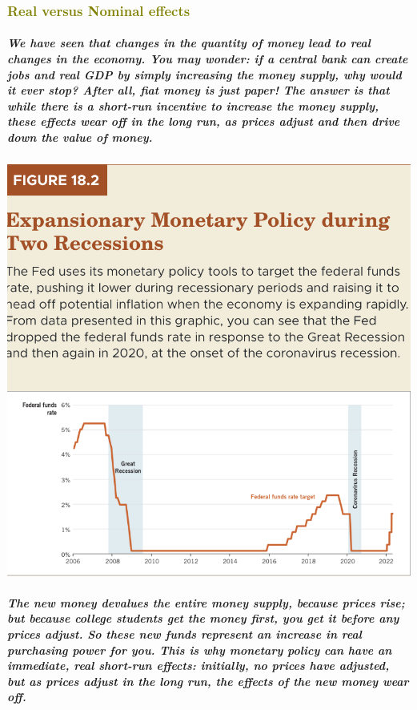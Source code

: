 \documentclass[11pt]{article} %
\begin{document}
\subsubsection*{\textcolor{olive}{Real versus Nominal effects}}
\subparagraph*{
We have seen that changes in the quantity of money lead to real changes in the economy. You may wonder: if a central bank can create jobs and real GDP by simply increasing the money supply, why would it ever stop? After all, fiat money is just paper! The answer is that while there is a short-run incentive to increase the money supply, these effects wear off in the long run, as prices adjust and then drive down the value of money.
}
\begin{center}
\includegraphics[scale=0.5]{images/Figure 18.2.png} 
\end{center}
\subparagraph*{The new money devalues the entire money supply, because prices rise; but because college students get the money first, you get it before any prices adjust. So these new funds represent an increase in real purchasing power for you. This is why monetary policy can have an immediate, real short-run effects: initially, no prices have adjusted, but as prices adjust in the long run, the effects of the new money wear off.}
\end{document}
